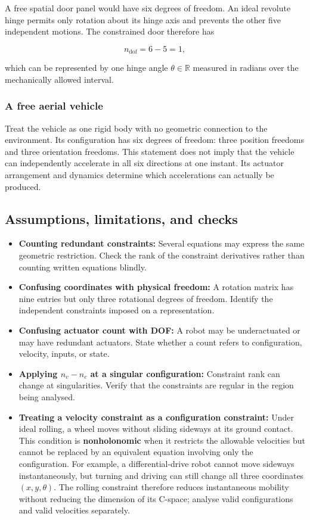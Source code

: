\documentclass[
  australian,
  12pt,
  letterpaper,
  DIV=11,
  numbers=noendperiod,
  twoside]{scrreprt}
\providecommand{\tightlist}{%
  \setlength{\itemsep}{0pt}\setlength{\parskip}{0pt}}
\begin{document}
A free spatial door panel would have six degrees of freedom. An ideal
revolute hinge permits only rotation about its hinge axis and prevents
the other five independent motions. The constrained door therefore has

\[
n_{\mathrm{dof}}
=
6-5
=
1,
\]

which can be represented by one hinge angle \(\theta\in\mathbb R\)
measured in radians over the mechanically allowed interval.

\subsubsection{A free aerial vehicle}\label{a-free-aerial-vehicle}

Treat the vehicle as one rigid body with no geometric connection to the
environment. Its configuration has six degrees of freedom: three
position freedoms and three orientation freedoms. This statement does
not imply that the vehicle can independently accelerate in all six
directions at one instant. Its actuator arrangement and dynamics
determine which accelerations can actually be produced.

\subsection{Assumptions, limitations, and
checks}\label{assumptions-limitations-and-checks}

\begin{itemize}
\tightlist
\item
  \textbf{Counting redundant constraints:} Several equations may express
  the same geometric restriction. Check the rank of the constraint
  derivatives rather than counting written equations blindly.
\item
  \textbf{Confusing coordinates with physical freedom:} A rotation
  matrix has nine entries but only three rotational degrees of freedom.
  Identify the independent constraints imposed on a representation.
\item
  \textbf{Confusing actuator count with DOF:} A robot may be
  underactuated or may have redundant actuators. State whether a count
  refers to configuration, velocity, inputs, or state.
\item
  \textbf{Applying \(n_v-n_c\) at a singular configuration:} Constraint
  rank can change at singularities. Verify that the constraints are
  regular in the region being analysed.
\item
  \textbf{Treating a velocity constraint as a configuration constraint:}
  Under ideal rolling, a wheel moves without sliding sideways at its
  ground contact. This condition is \textbf{nonholonomic} when it
  restricts the allowable velocities but cannot be replaced by an
  equivalent equation involving only the configuration. For example, a
  differential-drive robot cannot move sideways instantaneously, but
  turning and driving can still change all three coordinates
  \((x,y,\theta)\). The rolling constraint therefore reduces
  instantaneous mobility without reducing the dimension of its C-space;
  analyse valid configurations and valid velocities separately.
\end{itemize}
\end{document}
